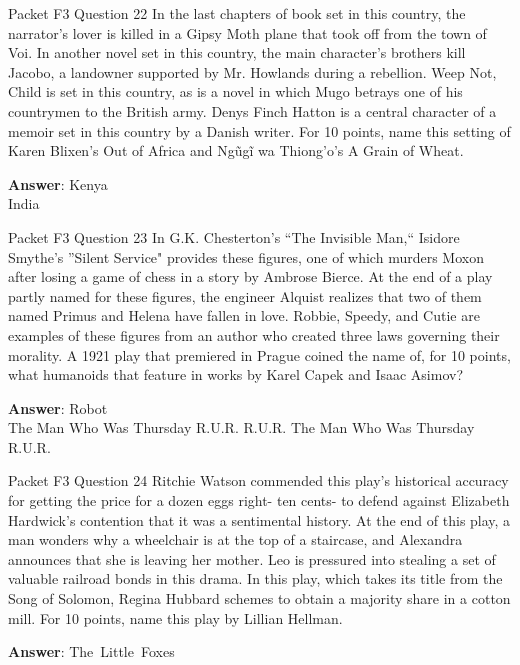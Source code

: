 \begin{frame}{Packet F3 Question 22}
In the last chapters of book set in this country, the narrator’s lover is killed in a Gipsy Moth plane that took off from the town of Voi. In another novel set in this country, the main character’s brothers kill Jacobo, a landowner supported by Mr. Howlands during a rebellion. Weep Not, Child is set in this country, as is a novel in which Mugo betrays one of his countrymen to the   British army. Denys Finch Hatton is a central   character of a memoir set in this country by a Danish writer. For 10 points, name this setting of Karen Blixen’s Out of Africa and Ngũgĩ wa Thiong’o’s A   Grain of Wheat.  

\textbf{Answer}: Kenya\\
 India
\end{frame}

\begin{frame}{Packet F3 Question 23}
In G.K. Chesterton’s “The   Invisible Man,`` Isidore Smythe’s ''Silent Service" provides these figures, one of which murders Moxon after losing a game of chess in a story by Ambrose Bierce. At the end of a play partly named for these figures, the   engineer Alquist realizes that two of them named Primus and Helena have fallen in love. Robbie, Speedy, and Cutie are examples of these figures from an author who created three laws governing their morality. A 1921 play that premiered in Prague coined the name of, for 10 points, what humanoids that feature in works by Karel Capek and Isaac   Asimov?      

\textbf{Answer}: Robot\\
 The Man Who Was Thursday
 R.U.R.
 R.U.R.
 The Man Who Was Thursday
 R.U.R.
\end{frame}

\begin{frame}{Packet F3 Question 24}
Ritchie Watson commended this play's historical accuracy for getting the price for a dozen eggs right- ten cents- to defend against Elizabeth Hardwick’s contention that it was a sentimental history. At the end of this play, a man wonders why a wheelchair is at the top of a staircase, and Alexandra announces that she is leaving her mother. Leo is pressured into stealing a set of valuable railroad bonds in this drama. In this play, which takes its title from the Song of Solomon, Regina Hubbard schemes     to obtain a majority share in a cotton mill. For 10 points,     name this play by Lillian Hellman.

\textbf{Answer}: The\ Little\ Foxes\\
\end{frame}

